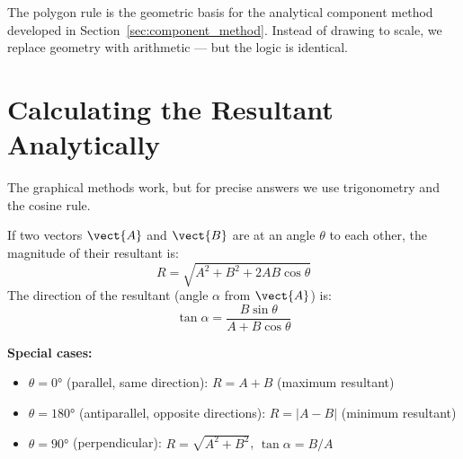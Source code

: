 \begin{diagbox}
\begin{center}
\end{center}
\end{diagbox}

\noindent The polygon rule is the geometric basis
for the analytical component method developed in
Section~\ref{sec:component_method}. Instead of drawing
to scale, we replace geometry with arithmetic --- but
the logic is identical.

\section{Calculating the Resultant Analytically}

The graphical methods work, but for precise answers we use
trigonometry and the cosine rule.

\begin{lawbox}
If two vectors $\vect{A}$ and $\vect{B}$ are at an angle
$\theta$ to each other, the magnitude of their resultant is:
\[
  R = \sqrt{A^2 + B^2 + 2AB\cos\theta}
\]
The direction of the resultant (angle $\alpha$ from
$\vect{A}$) is:
\[
  \tan\alpha = \frac{B\sin\theta}{A + B\cos\theta}
\]
\end{lawbox}

\textbf{Special cases:}

\begin{itemize}
  \item $\theta = 0°$ (parallel, same direction):
  $R = A + B$ (maximum resultant)
  \item $\theta = 180°$ (antiparallel, opposite directions):
  $R = |A - B|$ (minimum resultant)
  \item $\theta = 90°$ (perpendicular):
  $R = \sqrt{A^2 + B^2}$, $\tan\alpha = B/A$
\end{itemize}

